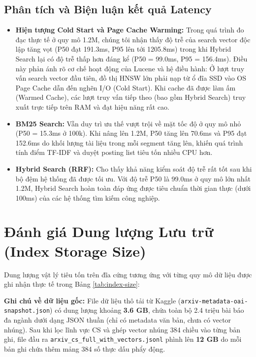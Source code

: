 \subsection{Phân tích và Biện luận kết quả Latency}
\begin{itemize}
    \item \textbf{Hiện tượng Cold Start và Page Cache Warming:} Trong quá trình đo đạc thực tế ở quy mô 1.2M, chúng tôi nhận thấy độ trễ của search vector độc lập tăng vọt (P50 đạt 191.3ms, P95 lên tới 1205.8ms) trong khi Hybrid Search lại có độ trễ thấp hơn đáng kể (P50 = 99.0ms, P95 = 156.4ms). Điều này phản ánh rõ cơ chế hoạt động của Lucene và hệ điều hành: Ở lượt truy vấn search vector đầu tiên, đồ thị HNSW lớn phải nạp từ ổ đĩa SSD vào OS Page Cache dẫn đến nghẽn I/O (Cold Start). Khi cache đã được làm ấm (Warmed Cache), các lượt truy vấn tiếp theo (bao gồm Hybrid Search) truy xuất trực tiếp trên RAM và đạt hiệu năng rất cao.
    \item \textbf{BM25 Search:} Vẫn duy trì ưu thế vượt trội về mặt tốc độ ở quy mô nhỏ (P50 = 15.3ms ở 100k). Khi nâng lên 1.2M, P50 tăng lên 70.6ms và P95 đạt 152.6ms do khối lượng tài liệu trong mỗi segment tăng lên, khiến quá trình tính điểm TF-IDF và duyệt posting list tiêu tốn nhiều CPU hơn.
    \item \textbf{Hybrid Search (RRF):} Cho thấy khả năng kiểm soát độ trễ rất tốt sau khi bộ đệm hệ thống đã được tối ưu. Với độ trễ P50 là 99.0ms ở quy mô lớn nhất 1.2M, Hybrid Search hoàn toàn đáp ứng được tiêu chuẩn thời gian thực (dưới 100ms) của các hệ thống tìm kiếm công nghiệp.
\end{itemize}

\section{Đánh giá Dung lượng Lưu trữ (Index Storage Size)}
Dung lượng vật lý tiêu tốn trên đĩa cứng tương ứng với từng quy mô dữ liệu được ghi nhận thực tế trong Bảng \ref{tab:index-size}:

\textbf{Ghi chú về dữ liệu gốc:} File dữ liệu thô tải từ Kaggle (\texttt{arxiv-metadata-oai-snapshot.json}) có dung lượng khoảng \textbf{3.6 GB}, chứa toàn bộ 2.4 triệu bài báo đa ngành dưới dạng JSON thuần (chỉ có metadata văn bản, chưa có vector nhúng). Sau khi lọc lĩnh vực CS và ghép vector nhúng 384 chiều vào từng bản ghi, file đầu ra \texttt{arxiv\_cs\_full\_with\_vectors.jsonl} phình lên \textbf{12 GB} do mỗi bản ghi chứa thêm mảng 384 số thực dấu phẩy động.

